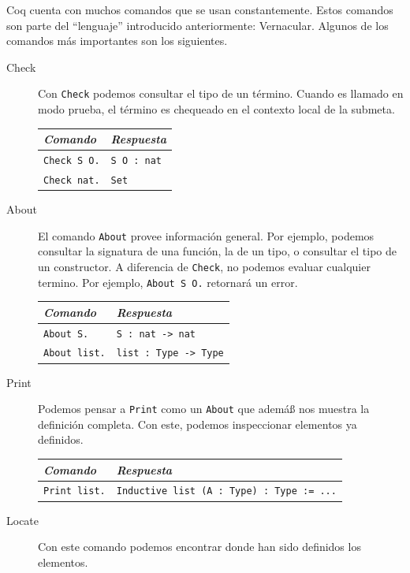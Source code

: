 Coq cuenta con muchos comandos que se usan constantemente. Estos comandos son parte del ``lenguaje'' introducido anteriormente: Vernacular. Algunos de los comandos más importantes son los siguientes.

\begin{description}
  \item[Check] Con \texttt{Check} podemos consultar el tipo de un término. Cuando es llamado en modo prueba, el término es chequeado en el contexto local de la submeta.
  \begin{center}
  \begin{tabular}{| l | l |}
  \hline
  \emph{Comando} & \emph{Respuesta} \\
  \hline
  \texttt{Check S O.} & \texttt{S O : nat} \\
  \texttt{Check nat.} & \texttt{Set} \\
  \hline
  \end{tabular}
  \end{center}
  \item[About] El comando \texttt{About} provee información general. Por ejemplo, podemos consultar la signatura de una función, la de un tipo, o consultar el tipo de un constructor. A diferencia de \texttt{Check}, no podemos evaluar cualquier termino. Por ejemplo, \texttt{About S O.} retornará un error.
  \begin{center}
  \begin{tabular}{| l | l |}
  \hline
  \emph{Comando} & \emph{Respuesta} \\
  \hline
  \texttt{About S.} & \texttt{S : nat -> nat} \\
  \texttt{About list.} & \texttt{list : Type -> Type} \\
  \hline
  \end{tabular}
  \end{center}
  \item[Print] Podemos pensar a \texttt{Print} como un \texttt{About} que ademáß nos muestra la definición completa. Con este, podemos inspeccionar elementos ya definidos.
  \begin{center}
  \begin{tabular}{| l | l |}
  \hline
  \emph{Comando} & \emph{Respuesta} \\
  \hline
  \texttt{Print list.} & \texttt{Inductive list (A : Type) : Type := ...} \\
  \hline
  \end{tabular}
  \end{center}
  \item[Locate] Con este comando podemos encontrar donde han sido definidos los elementos. 

\end{description}
